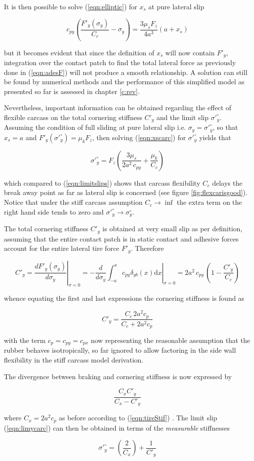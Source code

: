 \documentclass[12pt,a4paper]{report}
\newcommand{\eq}[2]{
\begin{equation} \label{#1}
#2
\end{equation}
}
\newcommand{\req}[1]{
(\ref{#1})
}
\newcommand{\de}[1]{
\mathrm{d} #1 
}
\begin{document}
It is then possible to solve \req{eqn:elliptic} for $x_s$ at pure lateral slip
\eq{eqn:xscarc}{c_{py}(\frac{F'_y(\sigma_y)}{C_c} - \sigma_y) = \frac{3\mu_{s}F_z}{4a^3} (a+x_s)}
but it becomes evident that since the definition of $x_s$ will now contain $F'_y$, integration over the contact patch to find the total lateral force as previously done in \req{eqn:adesF} will not produce a smooth relationship.
A solution can still be found by numerical methods and the performance of this simplified model as presented so far is assessed in chapter \ref{c:rev}.

Nevertheless, important information can be obtained regarding the effect of flexible carcass on the total cornering stiffness $C'_y$ and the limit slip $\sigma'^\circ_y$. 
Assuming the condition of full sliding at pure lateral slip i.e. $\sigma_y = \sigma'^\circ_y$, so that $x_s = a$ and $F'_y(\sigma'^\circ_y) = \mu_k F_z$, then solving \req{eqn:xscarc} for $\sigma'^\circ_y$ yields that

\eq{eqn:limycarc}{\sigma'^\circ_y = F_z (\frac{3\mu_s}{2a^2\, c_{py}} + \frac{\mu_k}{C_c})}
which compared to \req{eqn:limitslips} shows that carcass flexibility $C_c$ delays the break away point as far as lateral slip is concerned (see figure \ref{fig:flexcarisgood}). Notice that under the stiff carcass assumption $C_c \rightarrow \inf$ the extra term on the right hand side tends to zero and $\sigma'^\circ_y\rightarrow \sigma^\circ_y$.

The total cornering stiffness $C'_y$ is obtained at very small slip as per definition, assuming that the entire contact patch is in static contact and adhesive forces account for the entire lateral tire force $F'_y$. Therefore
\eq{eqn:cdash}{C'_y = \left. \frac{dF'_y(\sigma_y)}{d\sigma_y} \right|_{\sigma=0} = 
						-\frac{d}{d\sigma_y} \left. \int_{-a}^{a}c_{py}\delta_{yb}(x)\de{x} \right|_{\sigma=0} =
						2a^2 \, c_{py} \, (1-\frac{C'_y}{C_c})}
whence equating the first and last expressions the cornering stiffness is found as
\eq{eqn:cdashy}{C'_y = \frac{C_c \, 2a^2 c_p}{C_c + 2a^2 c_p}}
with the term $c_p = c_{py} = c_{px}$ now representing the reasonable assumption that the rubber behaves isotropically, so far ignored to allow factoring in the side wall flexibility in the stiff carcass model derivation.

The divergence between braking and cornering stiffness is now expressed by
\eq{eqn:cc}{\frac{C_x C'_y}{C_x - C'_y}}
where $C_x = 2a^2 c_p$ as before according to \req{eqn:tireStif}. The limit slip \req{eqn:limycarc} can then be obtained in terms of the \emph{measurable} stiffnesses
\eq{eqn:limslipy2}{\sigma'^\circ_y = (\frac{2}{C_x}) + \frac{1}{C'_y}}
\end{document}
